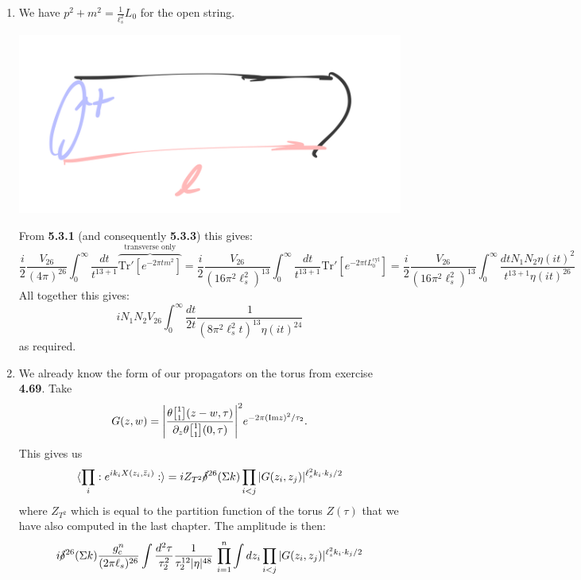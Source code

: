 \documentclass[11pt, class=article, crop=false]{standalone}
\begin{document}
\begin{enumerate}
	\item We have $p^2 + m^2 = \frac{1}{\ell_s^2} L_0$ for the open string.
	\begin{center}
		\includegraphics[scale=0.1]{"Drawings/512"}
	\end{center}
	 From \textbf{5.3.1} (and consequently \textbf{5.3.3}) this gives:
	\[
		\frac{i}{2} \frac{V_{26}}{(4\pi)^{26}} \int_0^\infty \frac{dt}{t^{13+1}} \overbrace{\mathrm{Tr'}[e^{-2\pi t m^2}]}^{\text{transverse only}} = \frac{i}{2} \frac{V_{26}}{(16\pi^2 \ell_s^2)^{13}} \int_0^\infty \frac{dt}{t^{13+1}} \mathrm{Tr'}[e^{-2\pi t L_0^{\text{cyl}}}] =  \frac{i}{2} \frac{V_{26}}{(16\pi^2 \ell_s^2)^{13}} \int_0^\infty \frac{dt N_1 N_2 \eta(i t)^2}{t^{13+1} \eta(i t)^{26}} 
	\]
	All together this gives:
	\[
		i N_1 N_2 V_{26} \int_0^\infty \frac{dt}{2 t} \frac{1}{(8 \pi^2 \ell_s^2 t)^{13} \eta(it)^{24}}
	\]
	as required.
	\item We already know the form of our propagators on the torus from exercise \textbf{4.69}. Take 
	\[
		G(z, w)= \Bigg|\frac{\theta\twist11 (z-w, \tau)}{\d_z \theta \twist11 (0, \tau)} \Bigg|^2 e^{-2 \pi (\mathrm{Im} z)^2 / \tau_2}.
	\]
	This gives us
	\[
		\braket{\prod_{i} :e^{i k_i X(z_i, \bar z_i)}:}  = i Z_{T^2} \cancel\delta^{26} (\Sigma k) \prod_{i < j} |G(z_i, z_j)|^{\ell_s^2 k_i \cdot k_j/2}
	\]
	where $Z_{T^2}$ which is equal to the partition function of the torus $Z(\tau)$ that we have also computed in the last chapter. The amplitude is then:
	\[
		i \cancel\delta^{26} (\Sigma k) \frac{g_c^n}{(2 \pi \ell_s)^{26}}  \int \frac{d^2 \tau}{\tau_2^2} \frac{1}{\tau_2^{12} |\eta|^{48}}\,  \prod_{i=1}^n \int dz_i  \prod_{i < j} |G(z_i, z_j)|^{\ell_s^2 k_i \cdot k_j/2}
	\]
	

\end{enumerate}
\end{document}
